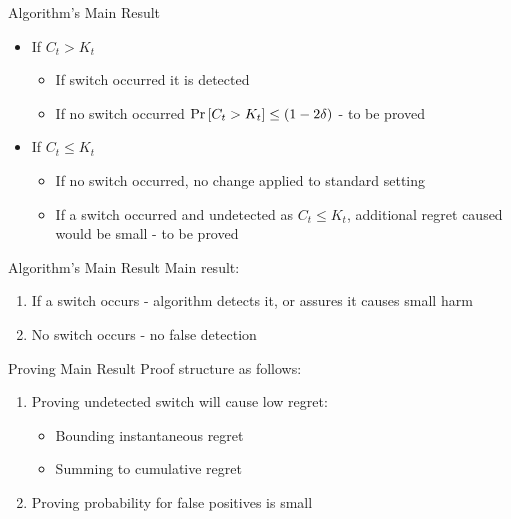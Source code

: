 \documentclass{beamer}
\begin{document}
\begin{frame}{Algorithm's Main Result}
\begin{itemize}
\item If $C_t>K_t$ \newline
\begin{itemize}
\item If switch occurred it is detected  \newline
\item If no switch occurred ${\rm Pr}\left[{C_t>K_t}\right]\leq \left(1-2\delta\right)$ - to be proved  \newline
\end{itemize}
\item If $C_t\leq K_t$ \newline
\begin{itemize}
\item If no switch occurred, no change applied to standard setting   \newline
\item If a switch occurred and undetected as $C_t\leq K_t$, additional regret caused would be small - to be proved   \newline 
\end{itemize}
\end{itemize}
\end{frame}

\begin{frame}{Algorithm's Main Result}
Main result:\newline\newline
\begin{enumerate}
\item If a switch occurs - algorithm detects it, or assures it causes small harm\newline 
\item No switch occurs - no false detection
\end{enumerate}
\end{frame}

\begin{frame}{Proving Main Result}
Proof structure as follows:\newline
\begin{enumerate}
\item Proving undetected switch will cause low regret:\newline
\begin{itemize}
\item Bounding instantaneous regret \newline
\item Summing to cumulative regret \newline
\end{itemize}
\item Proving probability for false positives is small
\end{enumerate}
\end{frame}
\end{document}
